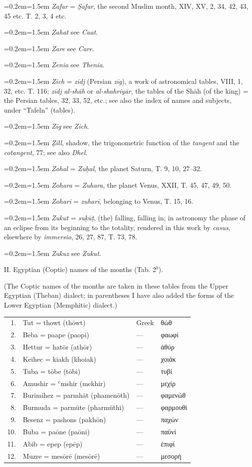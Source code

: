 \documentclass[11pt]{article}
\newcommand{\Pg}[1]{\marginpar{\footnotesize\color{gray}#1}}
\newcommand{\Entry}[1]{\par{\parskip=0.2em\relax\noindent\hangindent=1.5em\hangafter=1 #1\par}}
\begin{document}
\Entry{\emph{Zafar} = \emph{Ṣafar}, the second Muslim month, XIV, XV, 2, 34, 42, 43, 45 etc. T. 2, 3, 4 etc.}
\Entry{\emph{Zahat} see \emph{Caat}.}
\Entry{\emph{Zare} see \emph{Care}.}
\Entry{\emph{Zenia} see \emph{Thenia}.}
\Entry{\emph{Zich} = \emph{zīdj} (Persian \emph{zīg}), a work of astronomical tables, VIII, 1, 32, etc. T. 116; \emph{zīdj al-shāh} or \emph{al-shahriyār}, the tables of the Shāh (of the king) = the Persian tables, 32, \Pg{247}33, 52, etc.; see also the index of names and subjects, under “Tafeln” (tables).}
\Entry{\emph{Zīg} see \emph{Zich}.}
\Entry{\emph{Ẓill}, shadow, the trigonometric function of the \emph{tangent} and the \emph{cotangent}, 77; see also \emph{Dhel}.}
\Entry{\emph{Zohal} = \emph{Zuḥal}, the planet Saturn, T. 9, 10, 27–32.}
\Entry{\emph{Zohara} = \emph{Zuhara}, the planet Venus, XXII, T. 45, 47, 49, 50.}
\Entry{\emph{Zohari} = \emph{zuharī}, belonging to Venus, T. 15, 16.}
\Entry{\emph{Zukut} = \emph{suḳūṭ}, (the) falling, falling in; in astronomy the phase of an eclipse from its beginning to the totality, rendered in this work by \emph{casus}, elsewhere by \emph{immersio}, 26, 27, 87, T. 73, 78.}
\Entry{\emph{Zukuz} see \emph{Zukut}.}
\par\begin{center}II. Egyptian (Coptic) names of the months (Tab. 2$^{b}$).\end{center}
\par (The Coptic names of the months are taken in these tables from the Upper Egyptian (Theban) dialect; in parentheses I have also added the forms of the Lower Egyptian (Memphitic) dialect.)\par
\begin{center}\small\begin{tabular}{rlll}
1. & Tut = thowt (thōwt) & Greek & {\greekfont θώθ} \\
2. & Beba = paape (paopi) & — & {\greekfont φαωφί} \\
3. & Hettur = hatōr (athōr) & — & {\greekfont ἀθύρ} \\
4. & Keihec = kiakh (khoiak) & — & {\greekfont χοιάκ} \\
5. & Tuba = tōbe (tōbi) & — & {\greekfont τυβί} \\
6. & Amushir = $^{e}$mshir (mekhir) & — & {\greekfont μεχίρ} \\
7. & Burimihez = parmhāt (phamenōth) & — & {\greekfont φαμενώθ} \\
8. & Burmuda = parmūte (pharmūthi) & — & {\greekfont φαρμουθί} \\
9. & Besenz = pashons (pakhōn) & — & {\greekfont παχών} \\
10. & Buba = paōne (paōni) & — & {\greekfont παϋνί} \\
11. & Abib = epep (epēp) & — & {\greekfont ἐπιφί} \\
12. & Muzre = mesōrē (mesōrē) & — & {\greekfont μεσορή} \\
\end{tabular}\end{center}
\end{document}

